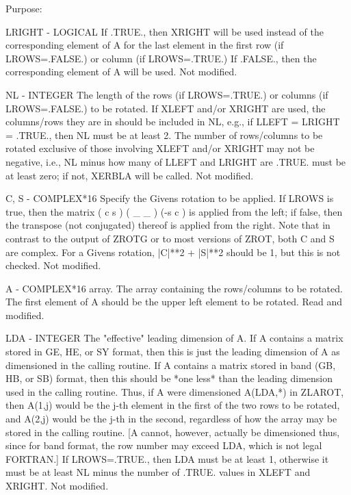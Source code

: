 \begin{DoxyParagraph}{Purpose\+: }
\begin{DoxyVerb}
  LRIGHT - LOGICAL
           If .TRUE., then XRIGHT will be used instead of the
           corresponding element of A for the last element in the
           first row (if LROWS=.FALSE.) or column (if LROWS=.TRUE.) If
           .FALSE., then the corresponding element of A will be used.
           Not modified.

  NL     - INTEGER
           The length of the rows (if LROWS=.TRUE.) or columns (if
           LROWS=.FALSE.) to be rotated.  If XLEFT and/or XRIGHT are
           used, the columns/rows they are in should be included in
           NL, e.g., if LLEFT = LRIGHT = .TRUE., then NL must be at
           least 2.  The number of rows/columns to be rotated
           exclusive of those involving XLEFT and/or XRIGHT may
           not be negative, i.e., NL minus how many of LLEFT and
           LRIGHT are .TRUE. must be at least zero; if not, XERBLA
           will be called.
           Not modified.

  C, S   - COMPLEX*16
           Specify the Givens rotation to be applied.  If LROWS is
           true, then the matrix ( c  s )
                                 ( _  _ )
                                 (-s  c )  is applied from the left;
           if false, then the transpose (not conjugated) thereof is
           applied from the right.  Note that in contrast to the
           output of ZROTG or to most versions of ZROT, both C and S
           are complex.  For a Givens rotation, |C|**2 + |S|**2 should
           be 1, but this is not checked.
           Not modified.

  A      - COMPLEX*16 array.
           The array containing the rows/columns to be rotated.  The
           first element of A should be the upper left element to
           be rotated.
           Read and modified.

  LDA    - INTEGER
           The "effective" leading dimension of A.  If A contains
           a matrix stored in GE, HE, or SY format, then this is just
           the leading dimension of A as dimensioned in the calling
           routine.  If A contains a matrix stored in band (GB, HB, or
           SB) format, then this should be *one less* than the leading
           dimension used in the calling routine.  Thus, if A were
           dimensioned A(LDA,*) in ZLAROT, then A(1,j) would be the
           j-th element in the first of the two rows to be rotated,
           and A(2,j) would be the j-th in the second, regardless of
           how the array may be stored in the calling routine.  [A
           cannot, however, actually be dimensioned thus, since for
           band format, the row number may exceed LDA, which is not
           legal FORTRAN.]
           If LROWS=.TRUE., then LDA must be at least 1, otherwise
           it must be at least NL minus the number of .TRUE. values
           in XLEFT and XRIGHT.
           Not modified.


\end{DoxyVerb}
\end{DoxyParagraph}
